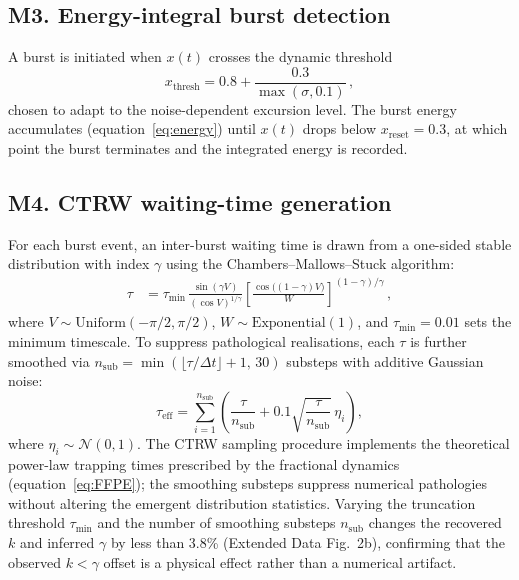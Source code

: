 \documentclass[twocolumn]{article}
\begin{document}
\subsection*{M3. Energy-integral burst detection}

A burst is initiated when $x(t)$ crosses the dynamic threshold
\begin{equation}
x_{\mathrm{thresh}} = 0.8 + \frac{0.3}{\max(\sigma, 0.1)}\,,
\tag{M3}
\label{eq:M3}
\end{equation}
chosen to adapt to the noise-dependent excursion level. The burst energy accumulates (equation~\ref{eq:energy}) until $x(t)$ drops below $x_{\mathrm{reset}} = 0.3$, at which point the burst terminates and the integrated energy is recorded.

\subsection*{M4. CTRW waiting-time generation}

For each burst event, an inter-burst waiting time is drawn from a one-sided stable distribution with index $\gamma$ using the Chambers--Mallows--Stuck algorithm\cite{chambers1976}:
\begin{align}
\tau &= \tau_{\min}\,\frac{\sin(\gamma V)}{(\cos V)^{1/\gamma}}\left[\frac{\cos\bigl((1-\gamma)V\bigr)}{W}\right]^{(1-\gamma)/\gamma}\,,
\tag{M4}
\label{eq:M4}
\end{align}
where $V \sim \mathrm{Uniform}(-\pi/2, \pi/2)$, $W \sim \mathrm{Exponential}(1)$, and $\tau_{\min} = 0.01$ sets the minimum timescale. To suppress pathological realisations, each $\tau$ is further smoothed via $n_{\mathrm{sub}} = \min(\lfloor\tau/\Delta t\rfloor + 1,\, 30)$ substeps with additive Gaussian noise:
\begin{equation}
\tau_{\mathrm{eff}} = \sum_{i=1}^{n_{\mathrm{sub}}} \left(\frac{\tau}{n_{\mathrm{sub}}} + 0.1\sqrt{\frac{\tau}{n_{\mathrm{sub}}}}\,\eta_i\right),
\tag{M5}
\label{eq:M5}
\end{equation}
where $\eta_i \sim \mathcal{N}(0,1)$. The CTRW sampling procedure implements the theoretical power-law trapping times prescribed by the fractional dynamics (equation~\ref{eq:FFPE}); the smoothing substeps suppress numerical pathologies without altering the emergent distribution statistics. Varying the truncation threshold $\tau_{\min}$ and the number of smoothing substeps $n_{\mathrm{sub}}$ changes the recovered $k$ and inferred $\gamma$ by less than 3.8\% (Extended Data Fig.~2b), confirming that the observed $k < \gamma$ offset is a physical effect rather than a numerical artifact.
\end{document}
